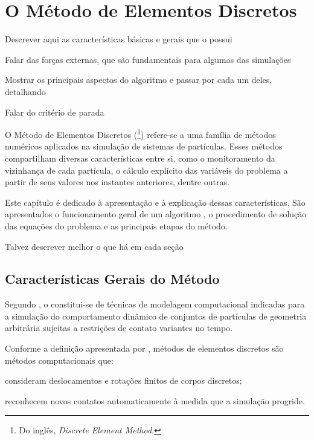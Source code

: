 \chapter{O Método de Elementos Discretos} \label{ch:discrete_element_method}

\alert{Descrever aqui as características básicas e gerais que o \DEM{} possui}

\alert{Falar das forças externas, que são fundamentais para algumas das simulações}

\alert{Mostrar os principais aspectos do algoritmo e passar por cada um deles, detalhando}

\alert{Falar do critério de parada}

O Método de Elementos Discretos (\DEM{}\footnote{Do inglês, \textit{Discrete Element Method}.}) refere-se a uma família de métodos numéricos aplicados na simulação de sistemas de partículas. Esses métodos compartilham diversas características entre si, como o monitoramento da vizinhança de cada partícula, o cálculo explícito das variáveis do problema a partir de seus valores nos instantes anteriores, dentre outras.

Este capítulo é dedicado à apresentação e à explicação dessas características. São apresentados o funcionamento geral de um algoritmo \DEM{}, o procedimento de solução das equações do problema e as principais etapas do método.

\alert{Talvez descrever melhor o que há em cada seção}

\section{Características Gerais do Método}

Segundo , o \DEM{} constitui-se de técnicas de modelagem computacional indicadas para a simulação do comportamento dinâmico de conjuntos de partículas de geometria arbitrária sujeitas a restrições de contato variantes no tempo.

Conforme a definição apresentada por , métodos de elementos discretos são métodos computacionais que:
\begin{alineas}
	\item consideram deslocamentos e rotações finitos de corpos discretos;
	\item reconhecem novos contatos automaticamente à medida que a simulação progride.
\end{alineas}

